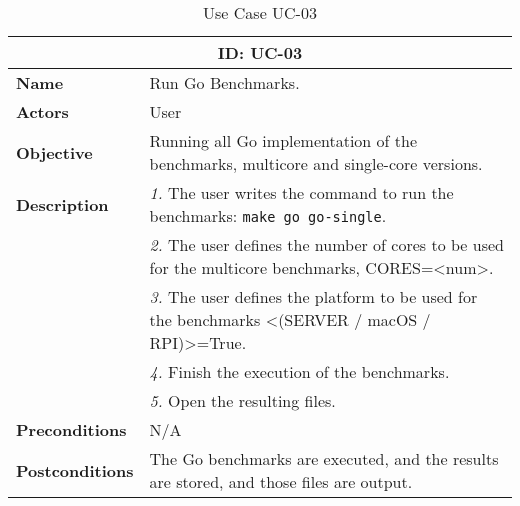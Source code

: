 \begin{table}[H]
    \centering
    \begin{tabular}{l p{10cm}}
        \toprule
        \multicolumn{2}{c}{\textbf{ID: UC-03}} \\
        \toprule
        \textbf{Name}                         &  Run Go Benchmarks. \\
        \textbf{Actors}                       &  User \\
        \textbf{Objective}                    &  Running all Go implementation of the benchmarks, multicore and single-core versions. \\
        \multirow{1}{*}{\textbf{Description}} & \textsl{1.} The user writes the command to run the benchmarks: \texttt{make go go-single}.\\
                                              & \textsl{2.} The user defines the number of cores to be used for the multicore benchmarks, CORES=<num>.\\
                                              & \textsl{3.} The user defines the platform to be used for the benchmarks <(SERVER / macOS / RPI)>=True.\\
                                              & \textsl{4.} Finish the execution of the benchmarks.\\
                                              & \textsl{5.} Open the resulting files.\\
        \textbf{Preconditions}                &  N/A \\
        \textbf{Postconditions}               &  The Go benchmarks are executed, and the results are stored, and those files are output. \\
    \end{tabular}
    \caption{Use Case UC-03}
    \label{tab:uc-03}
\end{table}



